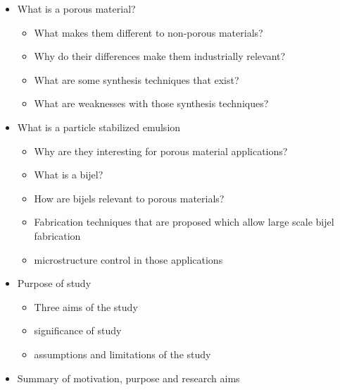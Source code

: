 \begin{itemize}
    \item What is a porous material? 
    \begin{itemize}
        \item What makes them different to non-porous materials?
        \item Why do their differences make them industrially relevant?
        \item What are some synthesis techniques that exist?
        \item What are weaknesses with those synthesis techniques?
    \end{itemize}
    \item What is a particle stabilized emulsion
    \begin{itemize}
        \item Why are they interesting for porous material applications?
        \item What is a bijel?
        \item How are bijels relevant to porous materials?
        \item Fabrication techniques that are proposed which allow large scale bijel fabrication
        \item microstructure control in those applications
    \end{itemize}
    \item Purpose of study
    \begin{itemize}
        \item Three aims of the study 
        \item significance of study
        \item assumptions and limitations of the study
    \end{itemize}
    \item Summary of motivation, purpose and research aims
\end{itemize}

